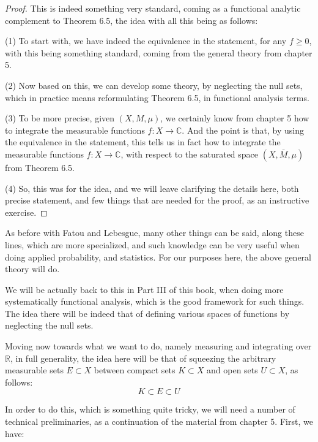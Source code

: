 \documentclass[12pt]{amsbook}
\begin{document}
\begin{proof}
This is indeed something very standard, coming as a functional analytic complement to Theorem 6.5, the idea with all this being as follows:

\medskip

(1) To start with, we have indeed the equivalence in the statement, for any $f\geq0$, with this being something standard, coming from the general theory from chapter 5.

\medskip

(2) Now based on this, we can develop some theory, by neglecting the null sets, which in practice means reformulating Theorem 6.5, in functional analysis terms.

\medskip

(3) To be more precise, given $(X,M,\mu)$, we certainly know from chapter 5 how to integrate the measurable functions $f:X\to\mathbb C$. And the point is that, by using the equivalence in the statement, this tells us in fact how to integrate the measurable functions $f:X\to\mathbb C$, with respect to the saturated space $(X,\bar{M},\mu)$ from Theorem 6.5.

\medskip

(4) So, this was for the idea, and we will leave clarifying the details here, both precise statement, and few things that are needed for the proof, as an instructive exercise.
\end{proof}

As before with Fatou and Lebesgue, many other things can be said, along these lines, which are more specialized, and such knowledge can be very useful when doing applied probability, and statistics. For our purposes here, the above general theory will do.

\bigskip

We will be actually back to this in Part III of this book, when doing more systematically functional analysis, which is the good framework for such things. The idea there will be indeed that of defining various spaces of functions by neglecting the null sets.

\bigskip

Moving now towards what we want to do, namely measuring and integrating over $\mathbb R$, in full generality, the idea here will be that of squeezing the arbitrary measurable sets $E\subset X$ between compact sets $K\subset X$ and open sets $U\subset X$, as follows:
$$K\subset E\subset U$$

In order to do this, which is something quite tricky, we will need a number of technical preliminaries, as a continuation of the material from chapter 5. First, we have:
\end{document}
